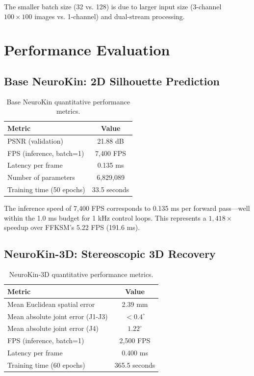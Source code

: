 ﻿\documentclass[12pt,a4paper,oneside]{report}
\begin{document}
The smaller batch size (32 vs. 128) is due to larger input size (3-channel $100 \times 100$ images vs. 1-channel) and dual-stream processing.

\section{Performance Evaluation}

\subsection{Base NeuroKin: 2D Silhouette Prediction}

\begin{table}[H]
\centering
\caption{Base NeuroKin quantitative performance metrics.}
\label{tab:neurokin_performance}
\begin{tabular}{lc}
\toprule
Metric & Value \\
\midrule
PSNR (validation) & 21.88 dB \\
FPS (inference, batch=1) & 7,400 FPS \\
Latency per frame & 0.135 ms \\
Number of parameters & 6,829,089 \\
Training time (50 epochs) & 33.5 seconds \\
\bottomrule
\end{tabular}
\end{table}

The inference speed of 7,400 FPS corresponds to 0.135 ms per forward pass---well within the 1.0 ms budget for 1 kHz control loops. This represents a $1,418\times$ speedup over FFKSM's 5.22 FPS (191.6 ms).

\subsection{NeuroKin-3D: Stereoscopic 3D Recovery}

\begin{table}[H]
\centering
\caption{NeuroKin-3D quantitative performance metrics.}
\label{tab:neurokin3d_performance}
\begin{tabular}{lc}
\toprule
Metric & Value \\
\midrule
Mean Euclidean spatial error & 2.39 mm \\
Mean absolute joint error (J1-J3) & $<0.4^\circ$ \\
Mean absolute joint error (J4) & $1.22^\circ$ \\
FPS (inference, batch=1) & 2,500 FPS \\
Latency per frame & 0.400 ms \\
Training time (60 epochs) & 365.5 seconds \\
\bottomrule
\end{tabular}
\end{table}
\end{document}
